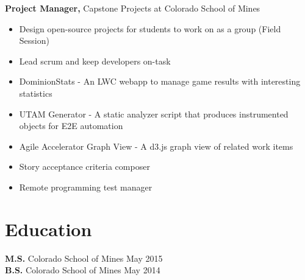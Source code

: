 \documentclass[12pt]{res}
\begin{document}
\begin{resume}
{\bf Project Manager,} Capstone Projects at Colorado School of Mines
\begin{itemize} \itemsep -2pt
    \item Design open-source projects for students to work on as a group (Field Session)
    \item Lead scrum and keep developers on-task
    \item DominionStats - An LWC webapp to manage game results with interesting statistics
    \item UTAM Generator - A static analyzer script that produces instrumented objects for E2E automation
    \item Agile Accelerator Graph View - A d3.js graph view of related work items
    \item Story acceptance criteria composer
    \item Remote programming test manager
\end{itemize}

\section{Education}

{\bf M.S.} Colorado School of Mines \hfill May 2015 \\
{\bf B.S.} Colorado School of Mines \hfill May 2014





\end{resume}
\end{document}
